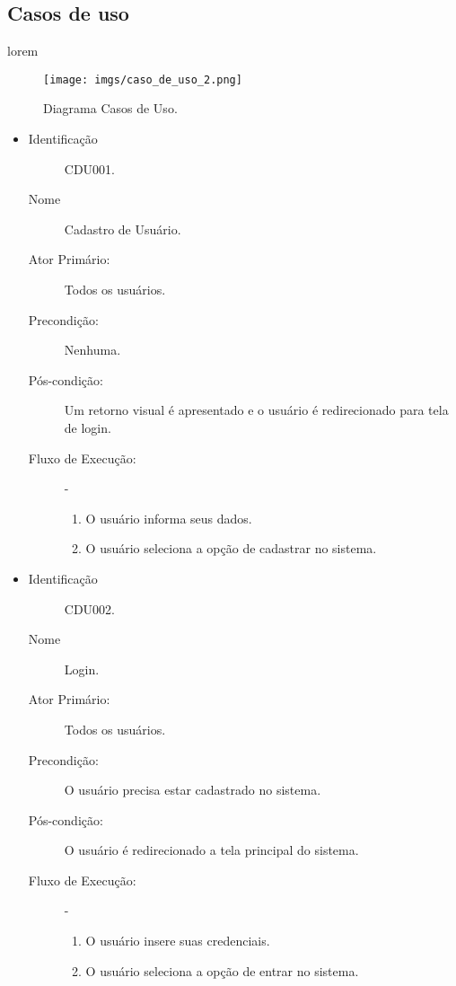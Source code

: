 \newpage
\subsection{Casos de uso}\label{subsec:casosdeuso}

lorem


\begin{figure}[h]
    \centering
    \texttt{[image: imgs/caso\_de\_uso\_2.png]}
    \caption{Diagrama Casos de Uso.}
    \label{fig:Figura1}
\end{figure}


\begin{itemize}
    \item
        \begin{description}
               \item[Identificação] CDU001.
               \item[Nome] Cadastro de Usuário.
               \item[Ator Primário:] Todos os usuários.
               \item[Precondição:] Nenhuma.
               \item[Pós-condição:] Um retorno visual é apresentado e o usuário é redirecionado para tela de login.
               \item[Fluxo de Execução:] - 
                    \begin{enumerate}
                        \item O usuário informa seus dados.
                        \item O usuário seleciona a opção de cadastrar no sistema.
                    \end{enumerate}
        \end{description}
        
    \vspace{10pt}
        
    \item   
        \begin{description}
               \item[Identificação] CDU002.
               \item[Nome] Login.
               \item[Ator Primário:] Todos os usuários.
               \item[Precondição:] O usuário precisa estar cadastrado no sistema.
               \item[Pós-condição:] O usuário é redirecionado a tela principal do sistema.
               \item[Fluxo de Execução:] - 
                    \begin{enumerate}
                        \item O usuário insere suas credenciais.
                        \item O usuário seleciona a opção de entrar no sistema.
                    \end{enumerate}
        \end{description}


\end{itemize}
